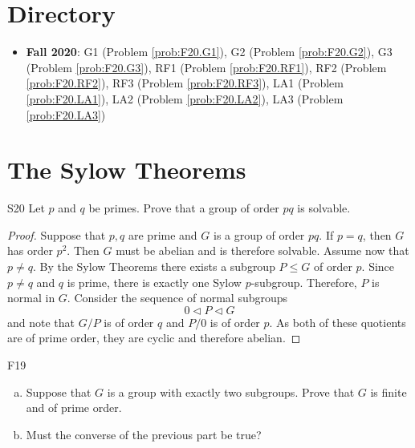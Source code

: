\documentclass{article}
\newcommand{\normal}{\triangleleft}
\theoremstyle{definition}
\begin{document}
\section{Directory}

\begin{itemize}
\item \textbf{Fall 2020}:  	G1 (Problem \ref{prob:F20.G1}), 
							G2 (Problem \ref{prob:F20.G2}), 
							G3 (Problem \ref{prob:F20.G3}),
							RF1 (Problem \ref{prob:F20.RF1}),
							RF2 (Problem \ref{prob:F20.RF2}),
							RF3 (Problem \ref{prob:F20.RF3}),
							LA1 (Problem \ref{prob:F20.LA1}),
							LA2 (Problem \ref{prob:F20.LA2}),
							LA3 (Problem \ref{prob:F20.LA3})
\end{itemize}

\section{The Sylow Theorems}

	\begin{prob}{S20}{}
	Let $p$ and $q$ be primes. Prove that a group of order $pq$ is solvable.
	\end{prob}
	
	\begin{proof}
	Suppose that $p,q$ are prime and $G$ is a group of order $pq$. If $p = q$, then $G$ has order $p^2$. Then $G$ must be abelian and is therefore solvable. Assume now that $p \neq q$. By the Sylow Theorems there exists a subgroup $P \leq G$ of order $p$. Since $p \neq q$ and $q$ is prime, there is exactly one Sylow $p$-subgroup. Therefore, $P$ is normal in $G$. Consider the sequence of normal subgroups
		\[0 \normal P \normal G \]
	and note that $G/P$ is of order $q$ and $P/0$ is of order $p$. As both of these quotients are of prime order, they are cyclic and therefore abelian. 
	\end{proof}
	
	\begin{prob}{F19}{}
	\begin{enumerate}[(a)]
	\item Suppose that $G$ is a group with exactly two subgroups. Prove that $G$ is finite and of prime order.
	\item Must the converse of the previous part be true?
	\end{enumerate}
	\end{prob}
	
\end{document}
